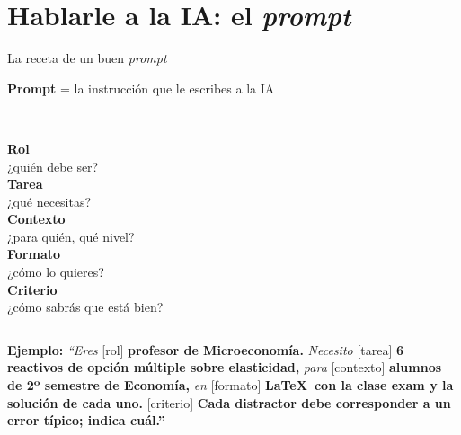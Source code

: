 \documentclass[aspectratio=169,10pt]{beamer}
\begin{document}
\section{Hablarle a la IA: el \emph{prompt}}

\begin{frame}{La receta de un buen \emph{prompt}}
\begin{center}
\Large\color{Dp}\textbf{Prompt} = la instrucción que le escribes a la IA
\end{center}
\vspace{10pt}
\begin{columns}[T]
\centering
\faUserTie\Large\\[4pt]\textbf{Rol}\\{\scriptsize ¿quién debe ser?}
\centering
\faTasks\Large\\[4pt]\textbf{Tarea}\\{\scriptsize ¿qué necesitas?}
\centering
\faInfoCircle\Large\\[4pt]\textbf{Contexto}\\{\scriptsize ¿para quién, qué nivel?}
\centering
{}\Large\\[4pt]\textbf{Formato}\\{\scriptsize ¿cómo lo quieres?}
\centering
\faCheckDouble\Large\\[4pt]\textbf{Criterio}\\{\scriptsize ¿cómo sabrás que está bien?}
\end{columns}
\vspace{10pt}
\begin{tcolorbox}[enhanced,colback=Ac!6,colframe=Ac,arc=2mm]
\small\textbf{Ejemplo:} \emph{``Eres} [rol] \textbf{profesor de Microeconomía.} \emph{Necesito} [tarea] \textbf{6 reactivos de opción múltiple sobre elasticidad,} \emph{para} [contexto] \textbf{alumnos de 2º semestre de Economía,} \emph{en} [formato] \textbf{\LaTeX\ con la clase exam y la solución de cada uno.} [criterio] \textbf{Cada distractor debe corresponder a un error típico; indica cuál.''}
\end{tcolorbox}
\end{frame}
\end{document}
